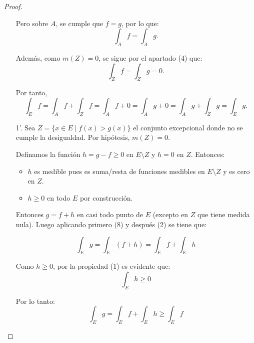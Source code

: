 \begin{proof}
\begin{enumerate}
              Pero sobre $A$, se cumple que $f = g$, por lo que:
              \[
                  \int_A f = \int_A g.
              \]

              Además, como $m(Z) = 0$, se sigue por el apartado (4) que:
              \[
                  \int_Z f = \int_Z g = 0.
              \]

              Por tanto,
              \[
                  \int_E f = \int_A f + \int_Z f = \int_A f + 0 = \int_A g + 0 = \int_A g + \int_Z g = \int_E g.
              \]
        \item [1'.] Sea $Z = \{x \in E \mid f(x) > g(x)\}$ el conjunto excepcional donde no se cumple la desigualdad. Por hipótesis, $m(Z) = 0$.
    
        Definamos la función $h = g - f \geq 0$ en $E \setminus Z$ y $h = 0$ en $Z$. Entonces:

        \begin{itemize}
            \item $h$ es medible pues es suma/resta de funciones medibles en $E \setminus Z$ y es cero en $Z$.
            \item $h \geq 0$ en todo $E$ por construcción.
        \end{itemize}

        Entonces $g = f + h$ en casi todo punto de $E$ (excepto en $Z$ que tiene medida nula). Luego aplicando primero (8) y después (2) se tiene que:

        \[
            \int_E g = \int_E (f + h) = \int_E f + \int_E h
        \]

        Como $h \geq 0$, por la propiedad (1) es evidente que:
        \[ \int_E h \geq 0 \]
          
        Por lo tanto:
        \[ \int_E g = \int_E f + \int_E h \geq \int_E f \]

    \end{enumerate}
\end{proof}

